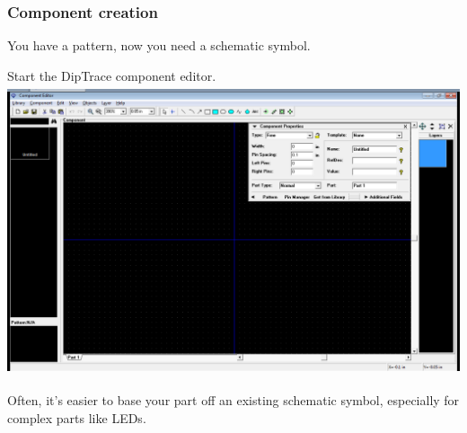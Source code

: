 \documentclass[letterpaper]{article}
\begin{document}
\subsubsection{Component creation}
\hypertarget{Toc337742704}{}{\sffamily\color[rgb]{0.30980393,0.5058824,0.7411765}
You have a pattern, now you need a schematic symbol.}


\bigskip

{\sffamily\color[rgb]{0.30980393,0.5058824,0.7411765}
Start the DipTrace component editor.\newline
 \includegraphics[width=5.4in,height=3.3665in]{figures/ee4document-img042.png} }

{\sffamily\color[rgb]{0.30980393,0.5058824,0.7411765}
Often, it's easier to base your part off an existing schematic symbol, especially for complex parts like LEDs.}
\end{document}
